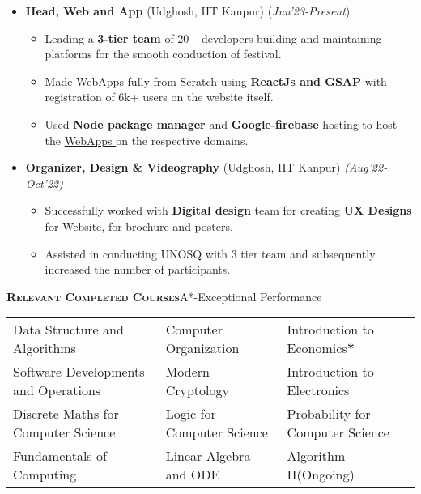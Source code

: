 \documentclass[10pt,a4paper]{extarticle}
\begin{document}
\begin{itemize}
\item \textbf{Head, Web and App} (Udghosh, IIT Kanpur)
\hfill\hfill(\textit{Jun'23-Present})
\begin{itemize}
\item Leading a \textbf{3-tier team} of 20+ developers building and maintaining platforms for the smooth conduction of festival.
\item Made WebApps fully from Scratch using \textbf{ReactJs and GSAP} with registration of 6k+ users on the website itself.
\item Used \textbf{Node package manager} and \textbf{Google-firebase} hosting to host the \href{https://ca.udghosh.org.in}{WebApps \faExternalLink} on the respective domains.
\end{itemize}

\vspace{0.5mm}
\item \textbf{Organizer, Design \& Videography} (Udghosh, IIT Kanpur) \hfill\textit{(Aug'22-Oct'22)}
\begin{itemize}
\item Successfully worked with \textbf{Digital design} team for creating \textbf{UX Designs} for Website, for brochure and posters.
\item Assisted in conducting UNOSQ with 3 tier team and subsequently increased the number of participants.

\vspace{-2.5mm}

\end{itemize}
\vspace{1mm}
\end{itemize}
\begin{tcolorbox}[colback=mygrey,height=6mm]{\textbf{\textsc{\large{Relevant Completed Courses}}}}\hfill{A*-Exceptional Performance}
\end{tcolorbox}
\vspace{-2mm}
\begin{center}
\begin{tabular}{|p{6cm}|p{6cm}|p{6cm}|}
\hline
Data Structure and Algorithms & Computer Organization & Introduction to Economics\textbf{*}\\
Software Developments and Operations & Modern Cryptology & Introduction to Electronics\\
Discrete Maths for Computer Science & Logic for Computer Science & Probability for Computer Science\\
Fundamentals of Computing &  Linear Algebra and ODE & Algorithm-II(Ongoing)\\
\hline
\end{tabular}
\end{center}
\end{document}

